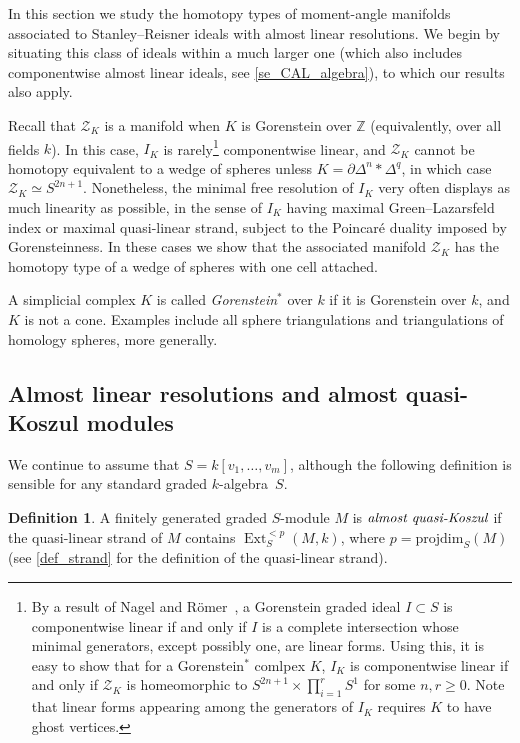 \documentclass[a4paper,10pt]{amsart}
\theoremstyle{definition}
\newtheorem{definition}[theorem]{Definition}
\theoremstyle{remark}
\newcommand{\pd}{\mathrm{projdim}}
\DeclareMathOperator{\Ext}{Ext}
\begin{document}
In this section we study the homotopy types of moment-angle manifolds associated to Stanley--Reisner ideals with almost linear resolutions. We begin by situating this class of ideals within a much larger one (which also includes componentwise almost linear ideals, see \cref{se_CAL_algebra}), to which our results also apply. 

Recall that $\mathcal{Z}_K$ is a manifold when $K$ is Gorenstein over $\mathbb{Z}$ (equivalently, over all fields $k$). In this case, $I_K$ is rarely\footnote{By a result of Nagel and R\"omer~\cite[Theorem~3.1]{NR}, a Gorenstein graded ideal $I\subset S$ is componentwise linear if and only if $I$ is a complete intersection whose minimal generators, except possibly one, are linear forms. Using this, it is easy to show that for a Gorenstein$^*$ comlpex $K$, $I_K$ is componentwise linear if and only if $\mathcal{Z}_K$ is homeomorphic to $S^{2n+1} \times\prod_{i=1}^rS^1$ for some $n,r\geqslant 0$. Note that linear forms appearing among the generators of $I_K$ requires $K$ to have ghost vertices.} componentwise linear, and $\mathcal{Z}_K$ cannot be homotopy equivalent to a wedge of spheres unless $K=\partial\Delta^n*\Delta^q$, in which case $\mathcal{Z}_K\simeq S^{2n+1}$. Nonetheless, the minimal free resolution of $I_K$ very often displays as much linearity as possible, in the sense of $I_K$ having maximal Green--Lazarsfeld index or maximal quasi-linear strand, subject to the Poincar\'e duality imposed by Gorensteinness. In these cases we show that the associated manifold $\mathcal{Z}_K$ has the homotopy type of a wedge of spheres with one cell attached.

A simplicial complex $K$ is called \emph{Gorenstein$^*$} over $k$ if it is Gorenstein over $k$, and $K$ is not a cone. Examples include all sphere triangulations and triangulations of homology spheres, more generally.


\subsection*{Almost linear resolutions and almost quasi-Koszul modules}

We continue to assume that $S=k[v_1,\ldots,v_m]$, although the following definition is sensible for any standard graded $k$-algebra~$S$.

\begin{definition}\label{def_AQK}
A finitely generated graded $S$-module $M$ is $\emph{almost quasi-Koszul}$ if the quasi-linear strand of $M$ contains $\Ext_S^{<p}(M,k)$, where $p=\pd_S(M)$ (see \cref{def_strand} for the definition of the quasi-linear strand).
\end{definition}
\end{document}
